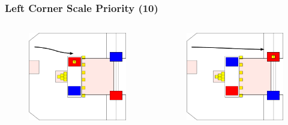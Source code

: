 \documentclass{beamer}
\begin{document}
\begin{frame}
 \frametitle{Left Corner Scale Priority \alert{(10)}}
 \begin{columns}
  \begin{figure}
   \includegraphics[scale=0.15]{assets/paths/10_LR}
  \end{figure}
  \begin{figure}
   \includegraphics[scale=0.15]{assets/paths/10_RL}

\end{figure}
\end{columns}
\end{frame}
\end{document}
